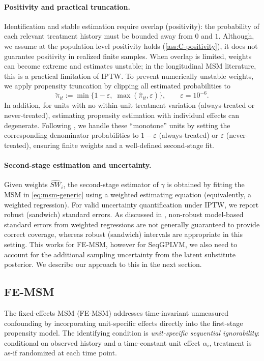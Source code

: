 \paragraph{Positivity and practical truncation.}
Identification and stable estimation require overlap (positivity): 
the probability of each relevant treatment history must be bounded away from $0$ and $1$. 
Although, we assume at the population level positivity holds (\ref{ass:C-positivity}), 
it does not guarantee positivity in realized finite samples.
When overlap is limited, weights can become extreme and estimates unstable; 
in the longitudinal MSM literature, this is a practical limitation of IPTW. 
To prevent numerically unstable weights, we apply propensity truncation by clipping all estimated probabilities to
\[
\widetilde{\pi}_{it} := \min\{1-\varepsilon,\;\max(\widehat{\pi}_{it},\varepsilon)\},\qquad \varepsilon=10^{-6}.
\]
In addition, for units with no within-unit treatment variation 
(always-treated or never-treated), estimating propensity estimation with individual effects can degenerate. 
Following \cite{blackwellEffectPoliticalAdvertising2024}, we handle these ``monotone'' 
units by setting the corresponding denominator probabilities to $1-\varepsilon$ 
(always-treated) or $\varepsilon$ (never-treated), ensuring finite weights and a 
well-defined second-stage fit. 

\paragraph{Second-stage estimation and uncertainty.}
Given weights $\widehat{SW}_i$, the second-stage estimator of $\gamma$ is 
obtained by fitting the MSM in
\eqref{eq:msm-generic} using a weighted estimating equation 
(equivalently, a weighted regression).
For valid uncertainty quantification under IPTW, we report robust (sandwich)
standard errors. As discussed in \cite{robinsMarginalStructuralModels2000},
non-robust model-based standard errors from weighted regressions are not generally
guaranteed to provide correct coverage, whereas robust (sandwich) intervals are
appropriate in this setting. This works for FE-MSM, however for SeqGPLVM, 
we also need to account for the additional sampling uncertainty from the latent substitute 
posterior. We describe our approach to this 
in the next section.

\subsection{FE-MSM}
The fixed-effects MSM (FE-MSM) addresses time-invariant unmeasured confounding by incorporating unit-specific effects directly into the first-stage propensity model. The identifying condition is \emph{unit-specific sequential ignorability}: conditional on observed history and a time-constant unit effect $\alpha_i$, treatment is as-if randomized at each time point.

